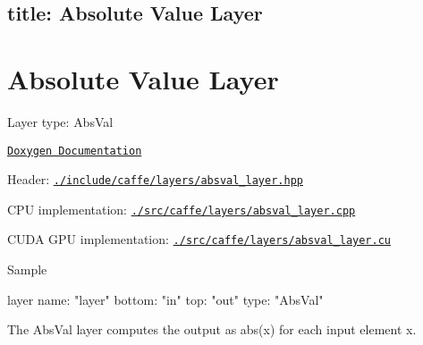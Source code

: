 

 \subsection*{title\+: Absolute Value Layer }

\section*{Absolute Value Layer}


\begin{DoxyItemize}
\item Layer type\+: {\ttfamily Abs\+Val}
\item \href{http://caffe.berkeleyvision.org/doxygen/classcaffe_1_1AbsValLayer.html}{\tt Doxygen Documentation}
\item Header\+: \href{https://github.com/BVLC/caffe/blob/master/include/caffe/layers/absval_layer.hpp}{\tt {\ttfamily ./include/caffe/layers/absval\+\_\+layer.hpp}}
\item C\+PU implementation\+: \href{https://github.com/BVLC/caffe/blob/master/src/caffe/layers/absval_layer.cpp}{\tt {\ttfamily ./src/caffe/layers/absval\+\_\+layer.cpp}}
\item C\+U\+DA G\+PU implementation\+: \href{https://github.com/BVLC/caffe/blob/master/src/caffe/layers/absval_layer.cu}{\tt {\ttfamily ./src/caffe/layers/absval\+\_\+layer.cu}}
\item Sample \begin{DoxyVerb}layer {
  name: "layer"
  bottom: "in"
  top: "out"
  type: "AbsVal"
}
\end{DoxyVerb}

\end{DoxyItemize}

The {\ttfamily Abs\+Val} layer computes the output as abs(x) for each input element x. 